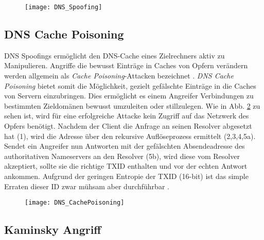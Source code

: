 \begin{figure}[htbp]
    \centering
    \texttt{[image: DNS\_Spoofing]}
    \caption{}
    \label{img:dnsspoofing}
\end{figure}


\subsection{DNS Cache Poisoning}

DNS Spoofings ermöglicht den DNS-Cache eines Zielrechners aktiv zu Manipulieren. Angriffe die bewusst Einträge in Caches von Opfern verändern werden allgemein als \textit{Cache Poisoning}-Attacken bezeichnet \cite{CAPEC141}. \textit{DNS Cache Poisoning} bietet somit die Möglichkeit, gezielt gefälschte Einträge in die Caches von Servern einzubringen\cite{CAPEC142}. Dies ermöglicht es einem Angreifer Verbindungen zu bestimmten Zieldomänen bewusst umzuleiten oder stillzulegen. Wie in Abb. \ref{img:dnscachepoisoning} zu sehen ist, wird für eine erfolgreiche Attacke kein Zugriff auf das Netzwerk des Opfers benötigt. Nachdem der Client die Anfrage an seinen Resolver abgesetzt hat (1), wird die Adresse über den rekursive Auflöseprozess ermittelt (2,3,4,5a). Sendet ein Angreifer nun Antworten mit der gefälschten Absendeadresse des authoritativen Nameservers an den Resolver (5b), wird diese vom Resolver akzeptiert, sollte sie die richtige TXID enthalten und vor der echten Antwort ankommen. Aufgrund der geringen Entropie der TXID (16-bit) ist das simple Erraten dieser ID zwar mühsam aber durchführbar \cite{Son2010}.      

\begin{figure}[htbp]
    \centering
    \texttt{[image: DNS\_CachePoisoning]}
    \caption{}
    \label{img:dnscachepoisoning}
\end{figure}

\subsection{Kaminsky Angriff}

